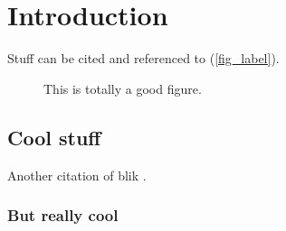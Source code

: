 \chapter{Introduction}\label{introduction}

Stuff can be cited \cite{Blik2021} and referenced to (\autoref{fig_label}).


\begin{figure}[ht]
    \centering
    \caption[Cool figure title]{This is totally a good figure.}
    \label{fig_label}
\end{figure}

\lipsum[1-10]

\section{Cool stuff}
\lipsum[1-3]

Another citation of blik \cite{Blik2021}.

\subsection{But really cool}
\lipsum[6-8]
